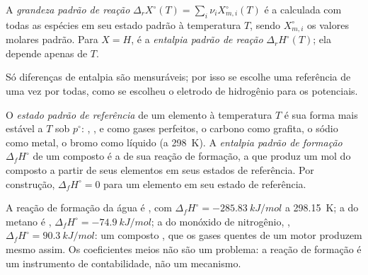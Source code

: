 \begin{definition}\label{def:b2:reaction-enthalpy:standard-reaction-enthalpy}
A \emph{grandeza padrão de reação}
$\Delta_r X^\circ(T) = \sum_i\nu_iX_{m,i}^\circ(T)$ é a 
calculada com todas as espécies em seu estado padrão à temperatura $T$,
sendo $X_{m,i}^\circ$ os valores molares padrão. Para $X = H$, é a
\emph{entalpia padrão de reação}
$\Delta_r H^\circ(T)$; ela depende apenas de $T$.
\end{definition}

Só diferenças de entalpia são mensuráveis; por isso se escolhe uma
referência de uma vez por todas, como se escolheu o eletrodo de hidrogênio
para os potenciais.

\begin{definition}\label{def:b2:reaction-enthalpy:formation}
O \emph{estado padrão de referência} de um
elemento à temperatura $T$ é sua forma mais estável a $T$ sob $p^\circ$:
, ,  e  como gases perfeitos, o carbono como
grafita, o sódio como metal, o bromo como líquido (a \qty{298}{K}).
A \emph{entalpia padrão de formação}
$\Delta_f H^\circ$ de um composto é a  de sua
reação de formação, a que produz um mol do composto a partir de seus
elementos em seus estados de referência. Por construção,
$\Delta_f H^\circ = 0$ para um elemento em seu estado de referência.
\end{definition}

\begin{example}\label{ex:b2:reaction-enthalpy:formation}
A reação de formação da água é , com
$\Delta_f H^\circ = \qty{-285.83}{kJ/mol}$ a \qty{298.15}{K}; a do
metano é , $\Delta_f H^\circ =
\qty{-74.9}{kJ/mol}$; a do monóxido de nitrogênio, , $\Delta_f H^\circ = \qty{+90.3}{kJ/mol}$: um composto ,
que os gases quentes de um motor produzem mesmo assim. Os coeficientes
meios não são um problema: a reação de formação é um instrumento de
contabilidade, não um mecanismo.
\end{example}

